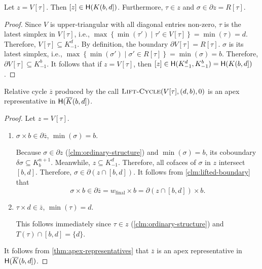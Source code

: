\documentclass[cleveref,a4paper,english,nolineno]{socg-lipics-v2021}
\newcommand{\Hgr}{{\sf H}}
\newcommand{\prism}[1]{\overline{#1}}
\newcommand{\bdry}{\partial}
\newcommand{\cbdry}{\delta}
\newcommand{\pK}{\prism{K}}
\newcommand{\pz}{\prism{z}}
\newcommand{\subK}[1]{K_{-1}^{#1}}
\newcommand{\supK}[1]{K_{#1}^{n+1}}
\newcommand{\ssx}{\sigma}
\newcommand{\tsx}{\tau}
\newcommand{\algname}[1]{\textsc{#1}}
\newcommand{\wfinal}{w_\textrm{final}}
\begin{document}
    \begin{claim}
        \label{clm:ordinary-structure}
        Let $z = V[\tsx]$. Then $[z] \in \Hgr(K(b,d])$.
        Furthermore, $\tsx \in z$ and $\ssx \in \bdry z = R[\tsx]$.
    \end{claim}
    \begin{proof}
        Since $V$ is upper-triangular with all diagonal entries non-zero,
        $\tsx$ is the latest simplex in $V[\tsx]$, i.e.,
        $\max \left\{ \min(\tsx') \mid \tsx' \in V[\tsx] \right\} = \min(\tsx) = d$.
        Therefore, $V[\tsx] \subseteq \subK{d}$.
        By definition, the boundary
        $\bdry V[\tsx] = R[\tsx]$. $\ssx$ is its latest simplex, i.e.,
        $\max \left\{ \min(\ssx') \mid \ssx' \in R[\tsx] \right\} = \min(\ssx) = b$.
        Therefore, $\bdry V[\tsx] \subseteq \subK{b}$.
        It follows that if $z = V[\tsx]$, then $[z] \in \Hgr(\subK{d}, \subK{b}) = \Hgr(K(b,d])$.
    \end{proof}

\begin{claim}%
    \label{clm:ordinary-correct}
    Relative cycle $\pz$ produced by the call $\algname{Lift-Cycle}(V[\tsx], (d,b), 0)$
    is an apex representative in $\Hgr(\pK(b,d])$.
\end{claim}
\begin{proof}
    Let $z = V[\tsx]$.
    \begin{enumerate}
        \item
            $\ssx \times b \in \bdry \pz$, $\min(\ssx) = b$.

            Because $\ssx \in \bdry z$ (\cref{clm:ordinary-structure}) and $\min(\ssx) = b$, its coboundary
            $\cbdry \ssx \subseteq \supK{b}$. Meanwhile, $z \subseteq \subK{d}$. Therefore,
            all cofaces of $\ssx$ in $z$ intersect $[b,d]$. Therefore, $\ssx \in
            \bdry \left( z \cap [b,d] \right)$. It follows from
            \cref{clm:lifted-boundary} that
            \[
                \ssx \times b \in \bdry \pz
                    = \wfinal \times b
                    = \bdry \left( z \cap [b,d] \right) \times b.
            \]

        \item
            $\tsx \times d \in \pz$, $\min(\tsx) = d$.

            This follows immediately since $\tsx \in z$ (\cref{clm:ordinary-structure}) and
            $T(\tsx) \cap [b,d] = \{ d \}$.
    \end{enumerate}
    It follows from \cref{thm:apex-representatives} that $\pz$ is
    an apex representative in $\Hgr(\pK(b,d])$.
\end{proof}
\end{document}
